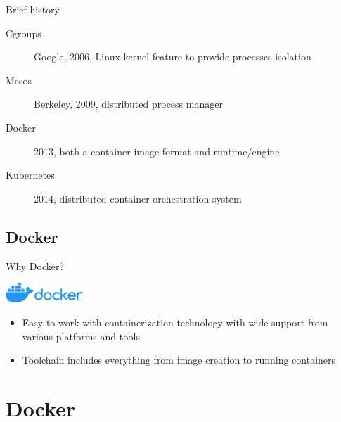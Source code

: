 \documentclass{beamer}
\begin{document}
\begin{frame}{Brief history}
  \begin{description}
    \item[Cgroups] Google, 2006, Linux kernel feature to provide processes
      isolation
    \item[Mesos] Berkeley, 2009, distributed process manager
    \item[Docker] 2013, both a container image format and runtime/engine
    \item[Kubernetes] 2014, distributed container orchestration system
  \end{description}
\end{frame}

\subsection{Docker}

\begin{frame}{Why Docker?}
  \begin{center}
    \includegraphics[height=0.75cm]{assets/dockerlogo.png}
  \end{center}
  \begin{itemize}
    \item Easy to work with containerization technology with wide support from
      various platforms and tools
    \item Toolchain includes everything from image creation to running
      containers
  \end{itemize}
\end{frame}

\section{Docker}
\end{document}
